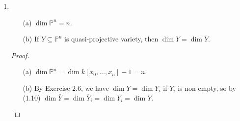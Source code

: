 \documentclass[12pt]{article}
\newcommand{\A}{\mathbb{A}}
\newcommand{\PP}{\mathbb{P}}
\theoremstyle{definition}
\begin{document}
\begin{enumerate} [label=\textbf{\arabic*.}, leftmargin=-0.05em]
\begin{proof}
    Let $\varphi_i : U_i \to \A^n$ be the homeomoprhism of (2.2),  let $Y_i$ be the affine variety $\varphi_i(Y \cap U_i)$, and let $A(Y_i)$ be its affine coordinate ring. If $g(y_1, \dots, y_n)$ is an element of $A(Y_i)$, then define the map $A(Y_i) \rightarrow S(Y)_{x_i}$ as $g(x_0 / x_i, \dots, x_n / x_i)$, or equivalently $g \mapsto \varphi_i^* g = g \circ \varphi_i$; thus we can identify $A(Y_i)$ with the subring of elements of degree $0$ of the localized ring $S(Y)_{x_i}$. Then, $S(Y)_{x_i} \simeq A(Y_i)[x_i, x_i^{-1}]$ since every monomial in $k[x_0, \dots, x_n]$ can be written as
    \begin{equation*}
        x_0^{d_0} \cdots x_i^{d_i} \cdots x_n^{d_n} = \frac{x_0^{d_0} \cdots \widehat{x_i^{d_i}} \cdots x_n^{d_n}}{x_i^{d_0 + \cdots + \widehat{d_i} + \cdots + d_n}} x_i^{d_0 + \cdots + d_n},
    \end{equation*}
    where the hat symbol denotes omission from the product/sum, and the quotient is in the image of $A(Y_i) \to S(Y)_{x_i}$. By (1.8A), the dimension of $S(Y)$ is equal to the transcendence degree of the quotient field of $S(Y)$, which is isomorphic to the quotient field of $S(Y)_{x_i}$, and by (1.7) the dimension of $A(Y_i)$ is equal to the dimension to $Y_i$, therefore we have
    \begin{equation*}
        \dim{S(Y)} = \dim{S(Y)_{x_i}} = \dim{A(Y_i)[x_i, x_i^{-1}]} = \dim{A(Y_i)} + 1 = \dim{Y_i} + 1.
    \end{equation*}
    Since the $Y_i$ cover $Y$, by Exercise 1.10 $\dim{Y} = \sup{\dim{Y_i}}$, so $\dim{S(Y)} = \dim{Y} + 1$.
\end{proof}

\item \begin{itemize}
    \item[(a)] $\dim{\PP^n} = n$.
    \item[(b)] If $Y \subseteq \PP^n$ is quasi-projective variety, then $\dim{Y} = \dim{\overline{Y}}$.
\end{itemize}

\begin{proof} $ $ \vspace{0pt}
   \begin{itemize}
        \item[(a)] $\dim{\PP^n} = \dim{k[x_0, \dots, x_n]} - 1 = n$.
        \item[(b)] By Exercise 2.6, we have $\dim{Y} = \dim{Y_i}$ if $Y_i$ is non-empty, so by (1.10) $\dim{\overline{Y}} = \dim{\overline{Y}_i} = \dim{Y_i} = \dim{Y}$.
   \end{itemize} 
\end{proof}


\end{enumerate}
\end{document}
